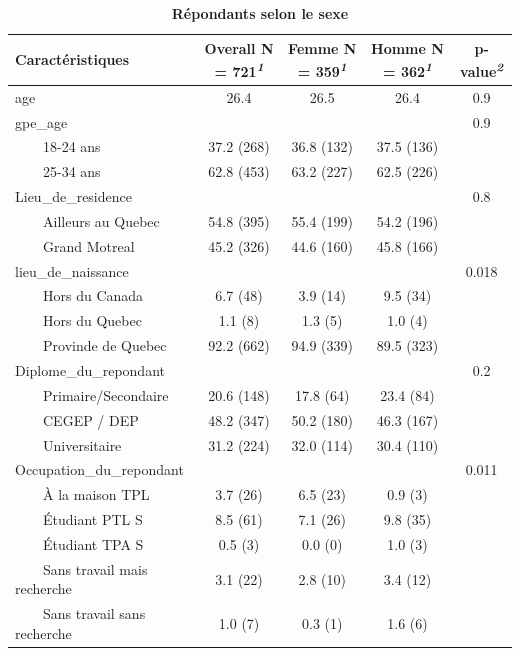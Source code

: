 \documentclass[
]{article}
\begin{document}
\begin{table}[!t]
\caption{\label{tab:unnamed-chunk-6}\textbf{Répondants selon le sexe}} 
\fontsize{12.0pt}{14.4pt}\selectfont
\begin{tabular*}{\linewidth}{@{\extracolsep{\fill}}lcccc}
\toprule
\textbf{Caractéristiques} & \textbf{Overall}  N = 721\textsuperscript{\textit{1}} & \textbf{Femme}  N = 359\textsuperscript{\textit{1}} & \textbf{Homme}  N = 362\textsuperscript{\textit{1}} & \textbf{p-value}\textsuperscript{\textit{2}} \\ 
\midrule\addlinespace[2.5pt]
age & 26.4 & 26.5 & 26.4 & 0.9 \\ 
gpe\_age &  &  &  & 0.9 \\ 
    18-24 ans & 37.2   (268) & 36.8   (132) & 37.5   (136) &  \\ 
    25-34 ans & 62.8   (453) & 63.2   (227) & 62.5   (226) &  \\ 
Lieu\_de\_residence &  &  &  & 0.8 \\ 
    Ailleurs au Quebec & 54.8   (395) & 55.4   (199) & 54.2   (196) &  \\ 
    Grand Motreal & 45.2   (326) & 44.6   (160) & 45.8   (166) &  \\ 
lieu\_de\_naissance &  &  &  & 0.018 \\ 
    Hors du Canada & 6.7   (48) & 3.9   (14) & 9.5   (34) &  \\ 
    Hors du Quebec & 1.1   (8) & 1.3   (5) & 1.0   (4) &  \\ 
    Provinde de Quebec & 92.2   (662) & 94.9   (339) & 89.5   (323) &  \\ 
Diplome\_du\_repondant &  &  &  & 0.2 \\ 
    Primaire/Secondaire & 20.6   (148) & 17.8   (64) & 23.4   (84) &  \\ 
    CEGEP / DEP & 48.2   (347) & 50.2   (180) & 46.3   (167) &  \\ 
    Universitaire & 31.2   (224) & 32.0   (114) & 30.4   (110) &  \\ 
Occupation\_du\_repondant &  &  &  & 0.011 \\ 
    À la maison TPL & 3.7   (26) & 6.5   (23) & 0.9   (3) &  \\ 
    Étudiant PTL S & 8.5   (61) & 7.1   (26) & 9.8   (35) &  \\ 
    Étudiant TPA S & 0.5   (3) & 0.0   (0) & 1.0   (3) &  \\ 
    Sans travail mais recherche & 3.1   (22) & 2.8   (10) & 3.4   (12) &  \\ 
    Sans travail sans recherche & 1.0   (7) & 0.3   (1) & 1.6   (6) &  \\ 

\end{tabular*}
\end{table}
\end{document}
